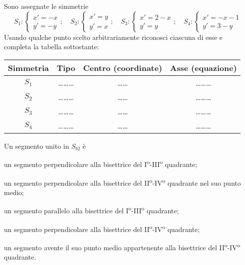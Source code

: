 \begin{esercizio}
  \label{ese:8.39} %
  Sono assegnate le simmetrie
  \[S_1:\begin{cases}x'=-x\\y'=-y\end{cases};\quad 
  S_2:\begin{cases}x'=y\\y'=x\end{cases};\quad
  S_3:\begin{cases}x'=2-x\\y'=y\end{cases};\quad 
  S_4:\begin{cases}x'=-x-1\\y'=3-y\end{cases}\]
  Usando qualche punto scelto arbitrariamente riconosci ciascuna di 
  esse e completa la tabella sottostante:
  \begin{center}
    \begin{tabular}{cccc}
      \toprule
      Simmetria & Tipo & Centro (coordinate) & Asse (equazione)\\
      \midrule
      $S_1$ & \ldots\ldots\ldots{} & \ldots\ldots{} & \ldots\ldots\ldots{} 
      \\
      $S_2$ & \ldots\ldots\ldots{} & \ldots\ldots{} & \ldots\ldots\ldots{} 
      \\
      $S_3$ & \ldots\ldots\ldots{} & \ldots\ldots{} & \ldots\ldots\ldots{} 
      \\
      $S_4$ & \ldots\ldots\ldots{} & \ldots\ldots{} & \ldots\ldots\ldots{} 
      \\
      \bottomrule
    \end{tabular}
  \end{center}
\end{esercizio}

\begin{esercizio}
  \label{ese:8.43} %
  Un segmento unito in $S_{b2}$ è
  \begin{enumeratea}
    \item un segmento perpendicolare alla bisettrice del 
    I\textsuperscript{o}-III\textsuperscript{o} quadrante;
    \item un segmento perpendicolare alla bisettrice del 
    II\textsuperscript{o}-IV\textsuperscript{o} quadrante nel suo punto 
    medio;
    \item un segmento parallelo alla bisettrice del 
    I\textsuperscript{o}-III\textsuperscript{o} quadrante;
    \item un segmento perpendicolare alla bisettrice del 
    II\textsuperscript{o}-IV\textsuperscript{o} quadrante;
    \item un segmento avente il suo punto medio appartenente alla 
    bisettrice del II\textsuperscript{o}-IV\textsuperscript{o} quadrante.
  \end{enumeratea}
\end{esercizio}

